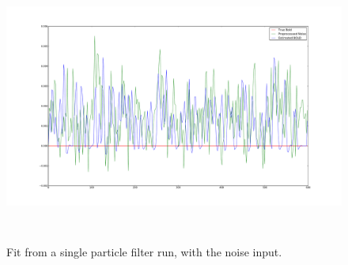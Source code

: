 \begin{figure}[H]
\centering
\includegraphics[clip=true,trim=6cm 3cm 6cm 3cm,height=9cm]{images/justnoise_fit_0}
\caption{Fit from a single particle filter run, with the noise input. }
\label{fig:justnoise_fit_0}
\end{figure} %

\begin{figure}[H]
\centering
{}\\
\end{figure}

